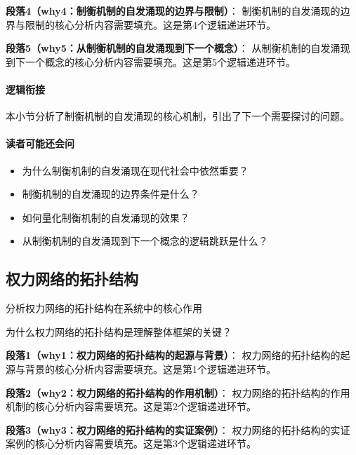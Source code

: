 \documentclass[../main.tex]{subfiles}
\begin{document}
\textbf{段落4（why4：制衡机制的自发涌现的边界与限制）}：
制衡机制的自发涌现的边界与限制的核心分析内容需要填充。这是第4个逻辑递进环节。


\textbf{段落5（why5：从制衡机制的自发涌现到下一个概念）}：
从制衡机制的自发涌现到下一个概念的核心分析内容需要填充。这是第5个逻辑递进环节。


\paragraph*{逻辑衔接}
本小节分析了制衡机制的自发涌现的核心机制，引出了下一个需要探讨的问题。

\paragraph*{读者可能还会问}
\begin{itemize}
\item 为什么制衡机制的自发涌现在现代社会中依然重要？
\item 制衡机制的自发涌现的边界条件是什么？
\item 如何量化制衡机制的自发涌现的效果？
\item 从制衡机制的自发涌现到下一个概念的逻辑跳跃是什么？
\end{itemize}


\subsection{权力网络的拓扑结构}

\begin{motivation}
分析权力网络的拓扑结构在系统中的核心作用
\end{motivation}

\begin{logicmap}
[逻辑链占位]
\end{logicmap}

\begin{questionbox}
为什么权力网络的拓扑结构是理解整体框架的关键？
\end{questionbox}

\textbf{段落1（why1：权力网络的拓扑结构的起源与背景）}：
权力网络的拓扑结构的起源与背景的核心分析内容需要填充。这是第1个逻辑递进环节。


\textbf{段落2（why2：权力网络的拓扑结构的作用机制）}：
权力网络的拓扑结构的作用机制的核心分析内容需要填充。这是第2个逻辑递进环节。


\textbf{段落3（why3：权力网络的拓扑结构的实证案例）}：
权力网络的拓扑结构的实证案例的核心分析内容需要填充。这是第3个逻辑递进环节。
\end{document}
